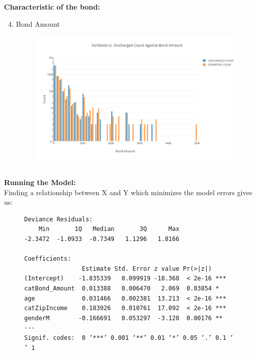 \documentclass{article}
\begin{document}
\textbf{Characteristic of the bond:}
~\\
\begin{enumerate}
\setcounter{enumi}{3}
\item Bond Amount
\begin{figure}[H]
\centering
\includegraphics[width=0.5\paperwidth]{Forfeited_vs_Discharged_Count_Against_Bond_Amount.png}
\end{figure}
\end{enumerate}
~\\
\textbf{Running the Model:}
~\\
Finding a relationship between X and Y which minimizes the model errors gives us:


\begin{figure}[H]
\centering
\begin{BVerbatim}
Deviance Residuals: 
    Min       1Q   Median       3Q      Max  
-2.3472  -1.0933  -0.7349   1.1296   1.8166  

Coefficients:
                Estimate Std. Error z value Pr(>|z|)    
(Intercept)    -1.835339   0.099919 -18.368  < 2e-16 ***
catBond_Amount  0.013388   0.006470   2.069  0.03854 *  
age             0.031466   0.002381  13.213  < 2e-16 ***
catZipIncome    0.183926   0.010761  17.092  < 2e-16 ***
genderM        -0.166691   0.053297  -3.128  0.00176 ** 
---
Signif. codes:  0 ‘***’ 0.001 ‘**’ 0.01 ‘*’ 0.05 ‘.’ 0.1 ‘ ’ 1
\end{BVerbatim}
\end{figure}
\end{document}
